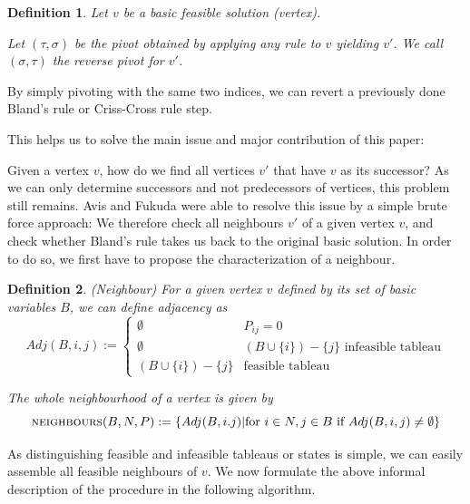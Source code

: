 \documentclass[a4paper, 11pt]{article}
\makeatletter
\newtheorem{mydef}{Definition}
\renewenvironment{quotation}
{\list{}{\listparindent=1.5em
		\itemindent=0pt
		\parsep\z@ \@plus\p@}%
	\item\relax}
{\endlist}
\makeatother
\begin{document}
\begin{mydef}
	Let $v$ be a basic feasible solution (vertex).\medskip
	
	Let $(\tau, \sigma)$ be the pivot obtained by applying \emph{any} rule to $v$ yielding $v'$.
	We call $(\sigma, \tau)$ the \textit{reverse pivot} for $v'$.
\end{mydef}

By simply pivoting with the same two indices, we can revert a previously done Bland's rule or Criss-Cross rule step. \medskip

This helps us to solve the main issue and major contribution of this paper:\medskip
\begin{quotation}
	Given a vertex $v$, how do we find all vertices $v'$ that have $v$ as its successor?
\end{quotation}
As we can only determine successors and not predecessors of vertices, this problem still remains. Avis and Fukuda were able to resolve this issue by a simple brute force approach: We therefore check all neighbours $v'$ of a given vertex $v$, and check whether Bland's rule takes us back to the original basic solution. In order to do so, we first have to propose the characterization of a neighbour.\medskip

\begin{mydef}(Neighbour)\medskip
	For a given vertex $v$ defined by its set of basic variables $B$, we can define \emph{adjacency} as\medskip
	\begin{equation*}
		Adj(B, i,j) := \left\{ \begin{matrix}
			\emptyset&P_{ij}=0\\
			\emptyset&(B\cup \{i\})-\{j\} \text{ infeasible tableau}\\
			
			(B\cup \{i\})-\{j\}&\text{feasible tableau}
		\end{matrix} \right.
	\end{equation*}
	
	The whole neighbourhood of a vertex is given by
	\begin{equation}
		\textsc{neighbours}(B,N,P):=\{ Adj(B,i.j) | \text{for }i\in N, j\in B\text{ if } Adj(B,i,j)\neq\emptyset \}
	\end{equation}

\end{mydef}

As distinguishing feasible and infeasible tableaus or states is simple, we can easily assemble all feasible neighbours of $v$. We now formulate the above informal description of the procedure in the following algorithm.
\end{document}

